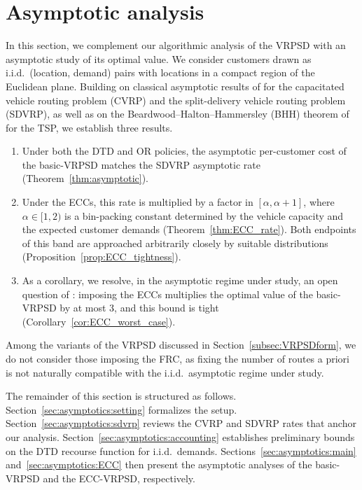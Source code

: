 \documentclass{article}
\newcommand{\rev}[1]{{\color{black}#1}}
\begin{document}
\rev{
\section{Asymptotic analysis}\label{sec:asymptotics}
In this section, we complement our algorithmic analysis of the VRPSD with an asymptotic study of its optimal value. We consider customers drawn as i.i.d.\ (location, demand) pairs with locations in a compact region of the Euclidean plane. Building on classical asymptotic results of \cite{haimovich1985bounds} for the capacitated vehicle routing problem (CVRP) and the split-delivery vehicle routing problem (SDVRP), as well as on the Beardwood–Halton–Hammersley (BHH) theorem of \cite{beardwood1959shortest} for the TSP, we establish three results.
\begin{enumerate}
    \item Under both the DTD and OR policies, the asymptotic per-customer cost of the basic-VRPSD matches the SDVRP asymptotic rate (Theorem~\ref{thm:asymptotic}).
    \item Under the ECCs, this rate is multiplied by a factor in $[\alpha, \alpha+1]$, where $\alpha \in [1, 2)$ is a bin-packing constant determined by the vehicle capacity and the expected customer demands (Theorem~\ref{thm:ECC_rate}). Both endpoints of this band are approached arbitrarily closely by suitable distributions (Proposition~\ref{prop:ECC_tightness}).
    \item As a corollary, we resolve, in the asymptotic regime under study, an open question of \cite{hoogendoorn2025evaluation}: imposing the ECCs multiplies the optimal value of the basic-VRPSD by at most 3, and this bound is tight (Corollary~\ref{cor:ECC_worst_case}).
\end{enumerate}

Among the variants of the VRPSD discussed in Section~\ref{subsec:VRPSDform}, we do not consider those imposing the FRC, as fixing the number of routes a priori is not naturally compatible with the i.i.d.\ asymptotic regime under study.

The remainder of this section is structured as follows. Section~\ref{sec:asymptotics:setting} formalizes the setup. Section~\ref{sec:asymptotics:sdvrp} reviews the CVRP and SDVRP rates that anchor our analysis. Section~\ref{sec:asymptotics:accounting} establishes preliminary bounds on the DTD recourse function for i.i.d.\ demands. Sections~\ref{sec:asymptotics:main} and~\ref{sec:asymptotics:ECC} then present the asymptotic analyses of the basic-VRPSD and the ECC-VRPSD, respectively.

}
\end{document}
